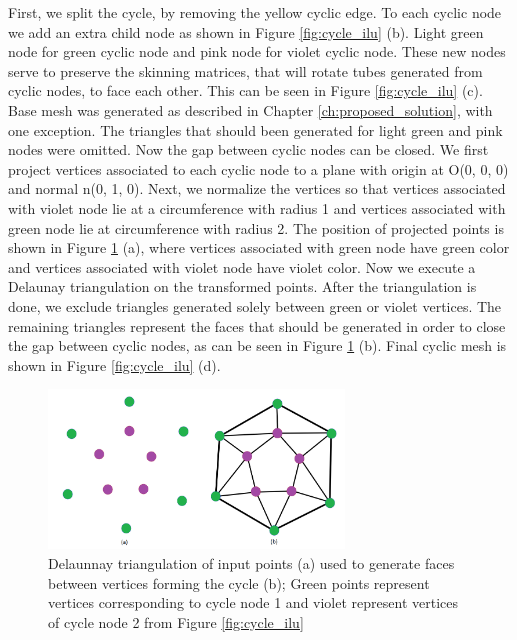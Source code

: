 First, we split the cycle, by removing the yellow cyclic edge.
To each cyclic node we add an extra child node as shown in Figure \ref{fig:cycle_ilu} (b).
Light green node for green cyclic node and pink node for violet cyclic node.
These new nodes serve to preserve the skinning matrices, that will rotate tubes generated from cyclic nodes, to face each other. This can be seen in Figure \ref{fig:cycle_ilu} (c). Base mesh was generated as described in Chapter \ref{ch:proposed_solution}, with one exception.
The triangles that should been generated for light green and pink nodes were omitted.
Now the gap between cyclic nodes can be closed.
We first project vertices associated to each cyclic node to a plane with origin at O(0, 0, 0) and normal n(0, 1, 0).
Next, we normalize the vertices so that vertices associated with violet node lie at a circumference with radius 1 and vertices associated with green node lie at circumference with radius 2.
The position of projected points is shown in Figure \ref{fig:del_ilu} (a), where vertices associated with green node have green color and vertices associated with violet node have violet color.
Now we execute a Delaunay triangulation on the transformed points.
After the triangulation is done, we exclude triangles generated solely between green or violet vertices.
The remaining triangles represent the faces that should be generated in order to close the gap between cyclic nodes, as can be seen in Figure \ref{fig:del_ilu} (b).
Final cyclic mesh is shown in Figure \ref{fig:cycle_ilu} (d).

\begin{figure}[ht]
    \centering
    \includegraphics[width=0.7\textwidth]{images/cycle_del}
    \caption[Delaunnay triangulation closing cyclic mesh]{Delaunnay triangulation of input points (a) used to generate faces between vertices forming the cycle (b); Green points represent vertices corresponding to cycle node 1 and violet represent vertices of cycle node 2 from Figure \ref{fig:cycle_ilu}}
    \label{fig:del_ilu}
\end{figure}

